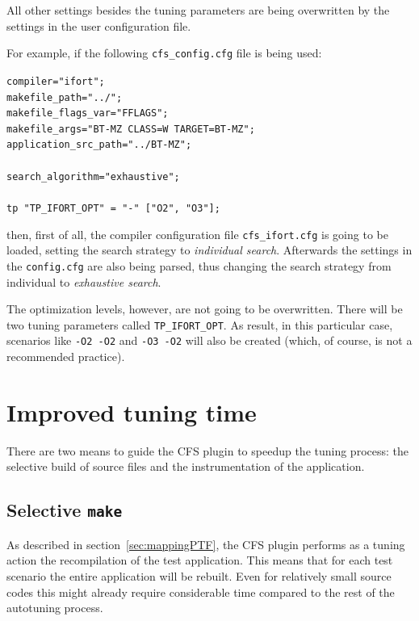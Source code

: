 \documentclass[11pt,a4paper, oneside]{book} %
\newenvironment{code}%
{
\addtolength{\leftskip}{0.5cm}}%
{

}
\begin{document}
All other settings besides the tuning parameters are being overwritten by the settings in the user configuration file.

For example, if the following \texttt{cfs\_config.cfg} file is being used:

\begin{code}
\texttt{compiler="ifort";\\
makefile\_path="../"; \\
makefile\_flags\_var="FFLAGS"; \\
makefile\_args="BT-MZ CLASS=W TARGET=BT-MZ"; \\
application\_src\_path="../BT-MZ"; \\
\\
search\_algorithm="exhaustive"; \\
\\
tp "TP\_IFORT\_OPT" = "-" ["O2", "O3"]; \\
}
\end{code}

then, first of all, the compiler configuration file \texttt{cfs\_ifort.cfg} is going to be loaded, setting the search strategy to \textit{individual search}. Afterwards the settings in the \texttt{config.cfg} are also being parsed, thus changing the search strategy from individual to \textit{exhaustive search}.

The optimization levels, however, are not going to be overwritten. There will be two tuning parameters called \texttt{TP\_IFORT\_OPT}. As result, in this particular case, scenarios like \texttt{-O2 -O2} and \texttt{-O3 -O2} will also be created (which, of course, is not a recommended practice).

\section{Improved tuning time}
There are two means to guide the CFS plugin to speedup the tuning process: the selective build of source files and the instrumentation of the application.

\subsection{Selective \texttt{make}}\label{sec:periscopeprofiling}
As described in section~\ref{sec:mappingPTF}, the CFS plugin performs as a tuning action the recompilation of the test application. This means that for each test scenario the entire application will be rebuilt. Even for relatively small source codes this might already require considerable time compared to the rest of the autotuning process.
\end{document}
